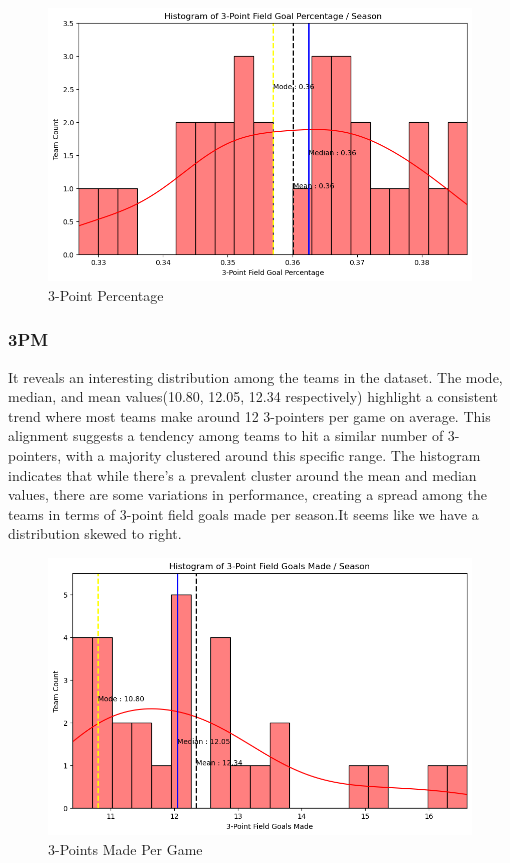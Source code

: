 \documentclass[conference]{IEEEtran}
\begin{document}
\begin{figure}[h]
    \centering
    \includegraphics[scale=0.41]{3P_image.png}
    \caption{3-Point Percentage }
    \label{fig:enter-label}
\end{figure}



\subsubsection{3PM}
It reveals an interesting distribution among the teams in the dataset. The mode, median, and mean values(10.80, 12.05, 12.34 respectively) highlight a consistent trend where most teams make around 12 3-pointers per game on average. This alignment suggests a tendency among teams to hit a similar number of 3-pointers, with a majority clustered around this specific range. The histogram indicates that while there's a prevalent cluster around the mean and median values, there are some variations in performance, creating a spread among the teams in terms of 3-point field goals made per season.It seems like we have a distribution skewed to right.

\begin{figure}[h]
    \centering
    \includegraphics[scale=0.41]{3PM_image.png}
    \caption{3-Points Made Per Game}
    \label{fig:enter-label}
\end{figure}
\end{document}
